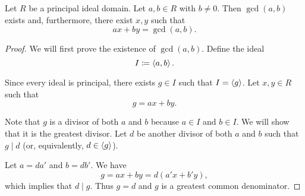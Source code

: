 \begin{theorem}\label{thm:bezout_identity}
  Let \( R \) be a principal ideal domain. Let \( a, b \in R \) with \( b \neq 0 \). Then \( \gcd(a, b) \) exists and, furthermore, there exist \( x, y \) such that
  \begin{equation*}
    ax + by = \gcd(a, b).
  \end{equation*}
\end{theorem}
\begin{proof}
  We will first prove the existence of \( \gcd(a, b) \). Define the ideal
  \begin{equation*}
    I \coloneqq \left\langle a, b \right\rangle.
  \end{equation*}

  Since every ideal is principal, there exists \( g \in I \) such that \( I = \left\langle g \right\rangle \). Let \( x, y \in R \) such that
  \begin{equation*}
    g = ax + by.
  \end{equation*}

  Note that \( g \) is a divisor of both \( a \) and \( b \) because \( a \in I \) and \( b \in I \). We will show that it is the greatest divisor. Let \( d \) be another divisor of both \( a \) and \( b \) such that \( g \mid d \) (or, equivalently, \( d \in \left\langle g \right\rangle \)).

  Let \( a = da' \) and \( b = db' \). We have
  \begin{equation*}
    g = ax + by = d(a'x + b'y),
  \end{equation*}
  which implies that \( d \mid g \). Thus \( g = d \) and \( g \) is a greatest common denominator.
\end{proof}

